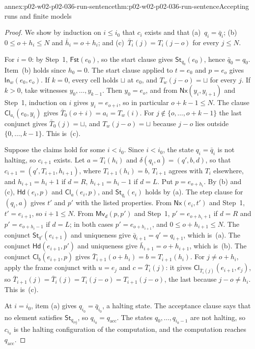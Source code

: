 \begin{annexitem}{annex:p02-w02-p02-036-run-sentence}{thm:p02-w02-p02-036-run-sentence}{Accepting runs and finite models}
\begin{proof}
We show by induction on \(i\leq i_0\) that \(c_i\) exists and that
(a)~\(q_i=\bar q_i\); (b)~\(0\leq o+h_i\leq N\) and \(\bar h_i=o+h_i\); and
(c)~\(\bar T_i(j)=T_i(j-o)\) for every \(j\leq N\).

For \(i=0\): by Step~1, \(\mathsf{Fst}(e_0)\), so the start clause gives
\(\mathsf{St}_{q_0}(e_0)\), hence \(\bar q_0=q_0\).  Item~(b) holds since
\(h_0=0\).  The start clause applied to \(t=e_0\) and \(p=e_o\) gives
\(\mathsf{In}_w(e_0,e_o)\).  If \(k=0\), every cell holds \(\sqcup\) at
\(e_0\), and \(T_w(j-o)=\sqcup\) for every \(j\).  If \(k>0\), take witnesses
\(y_0,\ldots,y_{k-1}\).  Then \(y_0=e_o\), and from
\(\mathsf{Nx}(y_i,y_{i+1})\) and Step~1, induction on \(i\) gives
\(y_i=e_{o+i}\), so in particular \(o+k-1\leq N\).  The clause
\(\mathsf{Cl}_{a_i}(e_0,y_i)\) gives \(\bar T_0(o+i)=a_i=T_w(i)\).  For
\(j\notin\{o,\ldots,o+k-1\}\) the last conjunct gives
\(\bar T_0(j)=\sqcup\), and \(T_w(j-o)=\sqcup\) because \(j-o\) lies
outside \(\{0,\ldots,k-1\}\).  This is~(c).

Suppose the claims hold for some \(i<i_0\).  Since \(i<i_0\), the state
\(q_i=\bar q_i\) is not halting, so \(c_{i+1}\) exists.  Let
\(a=T_i(h_i)\) and \(\delta(q_i,a)=(q',b,d)\), so that
\(c_{i+1}=(q',T_{i+1},h_{i+1})\), where \(T_{i+1}(h_i)=b\), \(T_{i+1}\) agrees
with \(T_i\) elsewhere, and \(h_{i+1}=h_i+1\) if \(d=R\), \(h_{i+1}=h_i-1\) if
\(d=L\).  Put \(p=e_{o+h_i}\).  By (b) and (c),
\(\mathsf{Hd}(e_i,p)\) and \(\mathsf{Cl}_a(e_i,p)\), and
\(\mathsf{St}_{q_i}(e_i)\) holds by (a).  The step clause for \((q_i,a)\) gives
\(t'\) and \(p'\) with the listed properties.  From \(\mathsf{Nx}(e_i,t')\) and
Step~1, \(t'=e_{i+1}\), so \(i+1\leq N\).  From \(\mathsf{Mv}_d(p,p')\) and
Step~1, \(p'=e_{o+h_i+1}\) if \(d=R\) and \(p'=e_{o+h_i-1}\) if \(d=L\);
in both cases \(p'=e_{o+h_{i+1}}\), and \(0\leq o+h_{i+1}\leq N\).  The
conjunct \(\mathsf{St}_{q'}(e_{i+1})\) and uniqueness give
\(\bar q_{i+1}=q'=q_{i+1}\), which is~(a).  The conjunct
\(\mathsf{Hd}(e_{i+1},p')\) and uniqueness give
\(\bar h_{i+1}=o+h_{i+1}\), which is~(b).  The conjunct
\(\mathsf{Cl}_b(e_{i+1},p)\) gives \(\bar T_{i+1}(o+h_i)=b=T_{i+1}(h_i)\).
For \(j\neq o+h_i\), apply the frame conjunct with \(u=e_j\) and
\(c=\bar T_i(j)\): it gives \(\mathsf{Cl}_{\bar T_i(j)}(e_{i+1},e_j)\), so
\(\bar T_{i+1}(j)=\bar T_i(j)=T_i(j-o)=T_{i+1}(j-o)\), the last because
\(j-o\neq h_i\).  This is~(c).

At \(i=i_0\), item (a) gives \(q_{i_0}=\bar q_{i_0}\), a halting state.  The
acceptance clause says that no element satisfies
\(\mathsf{St}_{q_{\mathrm{rej}}}\), so \(q_{i_0}=q_{\mathrm{acc}}\).  The states
\(q_0,\ldots,q_{i_0-1}\) are not halting, so \(c_{i_0}\) is the halting
configuration of the computation, and the computation reaches
\(q_{\mathrm{acc}}\).


\end{proof}
\end{annexitem}
